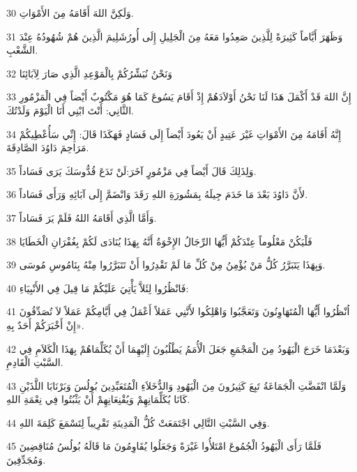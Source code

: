 \par 30 وَلَكِنَّ اللهَ أَقَامَهُ مِنَ الأَمْوَاتِ.
\par 31 وَظَهَرَ أَيَّاماً كَثِيرَةً لِلَّذِينَ صَعِدُوا مَعَهُ مِنَ الْجَلِيلِ إِلَى أُورُشَلِيمَ الَّذِينَ هُمْ شُهُودُهُ عِنْدَ الشَّعْبِ.
\par 32 وَنَحْنُ نُبَشِّرُكُمْ بِالْمَوْعِدِ الَّذِي صَارَ لِآبَائِنَا
\par 33 إِنَّ اللهَ قَدْ أَكْمَلَ هَذَا لَنَا نَحْنُ أَوْلاَدَهُمْ إِذْ أَقَامَ يَسُوعَ كَمَا هُوَ مَكْتُوبٌ أَيْضاً فِي الْمَزْمُورِ الثَّانِي: أَنْتَ ابْنِي أَنَا الْيَوْمَ وَلَدْتُكَ.
\par 34 إِنَّهُ أَقَامَهُ مِنَ الأَمْوَاتِ غَيْرَ عَتِيدٍ أَنْ يَعُودَ أَيْضاً إِلَى فَسَادٍ فَهَكَذَا قَالَ: إِنِّي سَأُعْطِيكُمْ مَرَاحِمَ دَاوُدَ الصَّادِقَةَ.
\par 35 وَلِذَلِكَ قَالَ أَيْضاً فِي مَزْمُورٍ آخَرَ:لَنْ تَدَعَ قُدُّوسَكَ يَرَى فَسَاداً.
\par 36 لأَنَّ دَاوُدَ بَعْدَ مَا خَدَمَ جِيلَهُ بِمَشُورَةِ اللهِ رَقَدَ وَانْضَمَّ إِلَى آبَائِهِ وَرَأَى فَسَاداً.
\par 37 وَأَمَّا الَّذِي أَقَامَهُ اللهُ فَلَمْ يَرَ فَسَاداً.
\par 38 فَلْيَكُنْ مَعْلُوماً عِنْدَكُمْ أَيُّهَا الرِّجَالُ الإِخْوَةُ أَنَّهُ بِهَذَا يُنَادَى لَكُمْ بِغُفْرَانِ الْخَطَايَا
\par 39 وَبِهَذَا يَتَبَرَّرُ كُلُّ مَنْ يُؤْمِنُ مِنْ كُلِّ مَا لَمْ تَقْدِرُوا أَنْ تَتَبَرَّرُوا مِنْهُ بِنَامُوسِ مُوسَى.
\par 40 فَانْظُرُوا لِئَلاَّ يَأْتِيَ عَلَيْكُمْ مَا قِيلَ فِي الأَنْبِيَاءِ:
\par 41 اُنْظُرُوا أَيُّهَا الْمُتَهَاوِنُونَ وَتَعَجَّبُوا وَاهْلِكُوا لأَنَّنِي عَمَلاً أَعْمَلُ فِي أَيَّامِكُمْ عَمَلاً لاَ تُصَدِّقُونَ إِنْ أَخْبَرَكُمْ أَحَدٌ بِهِ».
\par 42 وَبَعْدَمَا خَرَجَ الْيَهُودُ مِنَ الْمَجْمَعِ جَعَلَ الْأُمَمُ يَطْلُبُونَ إِلَيْهِمَا أَنْ يُكَلِّمَاهُمْ بِهَذَا الْكَلاَمِ فِي السَّبْتِ الْقَادِمِ.
\par 43 وَلَمَّا انْفَضَّتِ الْجَمَاعَةُ تَبِعَ كَثِيرُونَ مِنَ الْيَهُودِ وَالدُّخَلاَءِ الْمُتَعَبِّدِينَ بُولُسَ وَبَرْنَابَا اللَّذَيْنِ كَانَا يُكَلِّمَانِهِمْ وَيُقْنِعَانِهِمْ أَنْ يَثْبُتُوا فِي نِعْمَةِ اللهِ.
\par 44 وَفِي السَّبْتِ التَّالِي اجْتَمَعَتْ كُلُّ الْمَدِينَةِ تَقْرِيباً لِتَسْمَعَ كَلِمَةَ اللهِ.
\par 45 فَلَمَّا رَأَى الْيَهُودُ الْجُمُوعَ امْتَلأُوا غَيْرَةً وَجَعَلُوا يُقَاوِمُونَ مَا قَالَهُ بُولُسُ مُنَاقِضِينَ وَمُجَدِّفِينَ.
